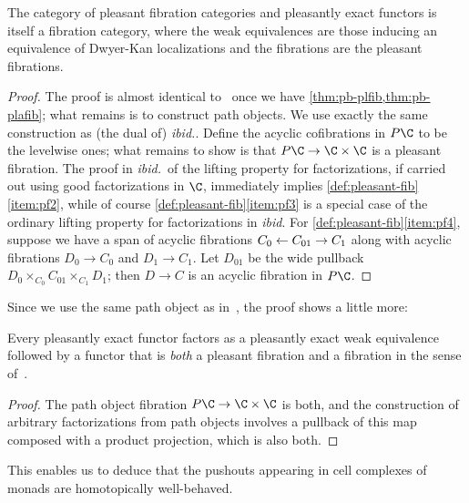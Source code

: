 \documentclass{amsart}
\begin{document}
\begin{thm}\label{thm:pleasant-fibcat}
  The category of pleasant fibration categories and pleasantly exact functors is itself a fibration category, where the weak equivalences are those inducing an equivalence of Dwyer-Kan localizations and the fibrations are the pleasant fibrations.
\end{thm}
\begin{proof}
  The proof is almost identical to~\cite[Theorem 1.14]{szumilo:cocompl-hoth} once we have \cref{thm:pb-plfib,thm:pb-plafib}; what remains is to construct path objects.
  We use exactly the same construction as (the dual of) \textit{ibid.}.
  Define the acyclic cofibrations in $P\C$ to be the levelwise ones; what remains to show is that $P\C \to\C\times \C$ is a pleasant fibration.
  The proof in \textit{ibid.}\ of the lifting property for factorizations, if carried out using good factorizations in $\C$, immediately implies \cref{def:pleasant-fib}\ref{item:pf2}, while of course \cref{def:pleasant-fib}\ref{item:pf3} is a special case of the ordinary lifting property for factorizations in \textit{ibid}.
  For \cref{def:pleasant-fib}\ref{item:pf4}, suppose we have a span of acyclic fibrations $C_0 \leftarrow C_{01} \to C_1$ along with acyclic fibrations $D_0 \to C_0$ and $D_1 \to C_1$.
  Let $D_{01}$ be the wide pullback $D_0 \times_{C_0} C_{01} \times_{C_1} D_1$; then $D \to C$ is an acyclic fibration in $P\C$.
\end{proof}

Since we use the same path object as in~\cite[Theorem 1.14]{szumilo:cocompl-hoth}, the proof shows a little more:

\begin{sch}\label{thm:dblfact}
  Every pleasantly exact functor factors as a pleasantly exact weak equivalence followed by a functor that is \emph{both} a pleasant fibration and a fibration in the sense of~\cite{szumilo:cocompl-hoth}.
\end{sch}
\begin{proof}
  The path object fibration $P\C \to\C\times \C$ is both, and the construction of arbitrary factorizations from path objects involves a pullback of this map composed with a product projection, which is also both.
\end{proof}

This enables us to deduce that the pushouts appearing in cell complexes of monads are homotopically well-behaved.
\end{document}
